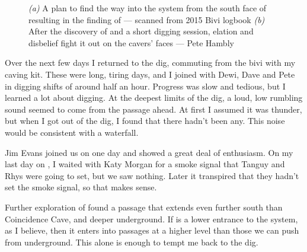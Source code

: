\begin{figure}[t!]
\begin{subfigure}{0.346\textwidth}
            \caption{}\label{coincidence cave}
        \end{subfigure}

        \caption{
            \emph{(a)} A plan to find the way into the system from the south face of  resulting in the finding of  --- scanned from 2015 Bivi logbook
            \emph{(b)} After the discovery of  and a short digging session, elation and disbelief fight it out on the cavers' faces --- Pete Hambly}
        \label{}

    \end{figure}

    Over the next few days I returned to the dig, commuting from the bivi with my caving kit. These were long, tiring days, and I joined with Dewi, Dave and Pete in digging shifts of around half an hour. Progress was slow and tedious, but I learned a lot about digging. At the deepest limits of the dig, a loud, low rumbling sound seemed to come from the passage ahead. At first I assumed it was thunder, but when I got out of the dig, I found that there hadn't been any. This noise would be consistent with a waterfall.

    Jim Evans joined us on one day and showed a great deal of enthusiasm. On my last day on , I waited with Katy Morgan for a smoke signal that Tanguy and Rhys were going to set, but we saw nothing. Later it transpired that they hadn't set the smoke signal, so that makes sense.

    Further exploration of  found a passage that extends even further south than Coincidence Cave, and deeper underground. If  is a lower entrance to the system, as I believe, then it enters into passages at a higher level than those we can push from underground. This alone is enough to tempt me back to the dig.

